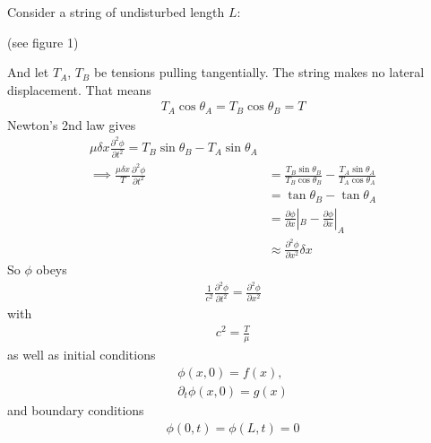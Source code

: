 \documentclass[a4paper]{article}
\begin{document}
\begin{eg}
Consider a string of undisturbed length $L$:


(see figure 1)

And let $T_A$, $T_B$ be tensions pulling tangentially. The string makes no lateral displacement. That means
\begin{equation*}
\begin{aligned}
T_A \cos \theta_A = T_B \cos \theta_B = T
\end{aligned}
\end{equation*}
Newton's 2nd law gives
\begin{equation*}
\begin{aligned}
\mu \delta x \frac{\partial^2 \phi}{\partial t^2} = T_B \sin \theta_B - T_A \sin \theta_A\\
\implies \frac{\mu\delta x}{T} \frac{\partial^2 \phi}{\partial t^2} &= \frac{T_B \sin \theta_B}{T_B \cos\theta_B} - \frac{T_A \sin \theta_A}{T_A \cos \theta_A} \\&= \tan \theta_B - \tan \theta_A\\
&= \frac{\partial \phi}{\partial x}|_B - \frac{\partial \phi}{\partial x}|_A\\
&\approx \frac{\partial^2 \phi}{\partial x^2} \delta x
\end{aligned}
\end{equation*}
So $\phi$ obeys
\begin{equation*}
\begin{aligned}
\frac{1}{c^2}\frac{\partial^2\phi}{\partial t^2} = \frac{\partial^2 \phi}{\partial x^2}
\end{aligned}
\end{equation*}
with
\begin{equation*}
\begin{aligned}
c^2 = \frac{T}{\mu}
\end{aligned}
\end{equation*}
as well as initial conditions
\begin{equation*}
\begin{aligned}
\phi\left(x,0\right) = f\left(x\right),\\
\partial_t \phi\left(x,0\right) = g\left(x\right)
\end{aligned}
\end{equation*}
and boundary conditions
\begin{equation*}
\begin{aligned}
\phi\left(0,t\right) = \phi\left(L,t\right) = 0
\end{aligned}
\end{equation*}


\end{eg}
\end{document}
